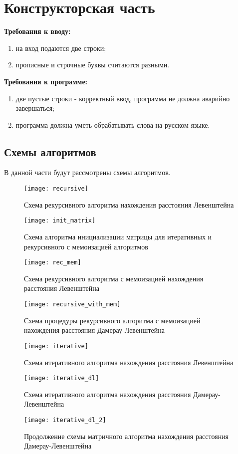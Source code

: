 \chapter{Конструкторская часть}
\textbf{Требования к вводу:}
\begin{enumerate}
  	\item на вход подаются две строки;
	\item прописные и строчные буквы считаются разными.
\end{enumerate}
\textbf{Требования к программе:}
\begin{enumerate}
  	\item две пустые строки - корректный ввод, программа не должна аварийно завершаться;
  	\item программа должна уметь обрабатывать слова на русском языке.
\end{enumerate}
\section{Схемы алгоритмов}
В данной части будут рассмотрены схемы алгоритмов.

\begin{figure}[h]
\centering
\texttt{[image: recursive]}
\caption{Схема рекурсивного алгоритма нахождения расстояния Левенштейна}
\label{fig:mpr}
\end{figure}

\begin{figure}[h]
\centering
\texttt{[image: init\_matrix]}
\caption{Схема алгоритма инициализации матрицы для итеративных и рекурсивного с мемоизацией алгоритмов}
\label{fig:mpr}
\end{figure}

\begin{figure}[h]
\centering
\texttt{[image: rec\_mem]}
\caption{Схема рекурсивного алгоритма с мемоизацией нахождения расстояния Левенштейна}
\label{fig:mpr}
\end{figure}

\begin{figure}[h]
\centering
\texttt{[image: recursive\_with\_mem]}
\caption{Схема процедуры рекурсивного алгоритма с мемоизацией нахождения расстояния Дамерау-Левенштейна}
\label{fig:mpr}
\end{figure}

\begin{figure}[h]
\centering
\texttt{[image: iterative]}
\caption{Схема итеративного алгоритма нахождения расстояния Левенштейна}
\label{fig:mpr}
\end{figure}

\begin{figure}[h]
\centering
\texttt{[image: iterative\_dl]}
\caption{Схема итеративного алгоритма нахождения расстояния Дамерау-Левенштейна}
\label{fig:mpr}
\end{figure}

\begin{figure}[h]
\centering
\texttt{[image: iterative\_dl\_2]}
\caption{Продолжение схемы матричного алгоритма нахождения расстояния Дамерау-Левенштейна}
\label{fig:mpr}
\end{figure}
